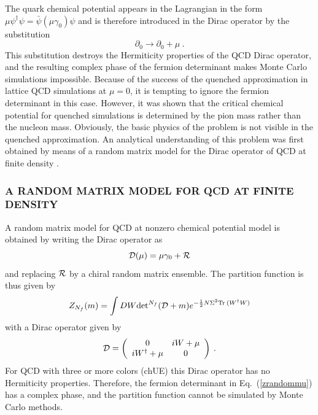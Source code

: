 The quark chemical potential appears in the Lagrangian in the form
$\mu\psi^\dagger\psi=\bar\psi(\mu\gamma_0)\psi$ and is therefore
introduced in the Dirac operator by the substitution
\begin{equation}
  \partial_0 \rightarrow \partial_0 + \mu\:.
\end{equation}
This substitution destroys the Hermiticity properties of the QCD Dirac
operator, and the resulting complex phase of the fermion determinant
makes Monte Carlo simulations impossible.  Because of the success of
the quenched approximation in lattice QCD simulations at $\mu=0$, it
is tempting to ignore the fermion determinant in this case.
However, it was shown \cite{everybody,maria} that the critical
chemical potential for quenched simulations is determined by the pion
mass rather than the nucleon mass. Obviously, the basic physics of the
problem is not visible in the quenched approximation.  An analytical
understanding of this problem was first obtained by means of a random
matrix model for the Dirac operator of QCD at finite density
\cite{Misha}.

 
\subsubsection{A RANDOM MATRIX MODEL FOR QCD AT FINITE DENSITY}
\label{RMMmu}

A random matrix model for QCD at nonzero chemical potential model is
obtained by writing the Dirac operator as \cite{Misha}
\begin{equation}
  {\cal D}(\mu) = \mu \gamma_0 + {\cal R}
\end{equation}
and replacing ${\cal R}$ by a chiral random matrix ensemble. The partition
function is thus given by
\begin{equation}
  Z_{N_f}(m) = \int DW  {\det}^{N_f}({\cal D} +m)
  e^{-\frac12N\Sigma^2 {\rm Tr\:}(W^\dagger W)}
  \label{zrandommu}
\end{equation}
with a Dirac operator given by
\begin{equation}
  {\cal D} = \left (\begin{array}{cc} 0 & iW +\mu\\
      iW^\dagger +\mu& 0 \end{array} \right )\:.
  \label{diracopmu}
\end{equation}
For QCD with three or more colors (chUE) this Dirac
operator has no Hermiticity properties. Therefore, the
fermion determinant in Eq.~(\ref{zrandommu}) has a complex phase, and the
partition function cannot be simulated by Monte Carlo methods.

